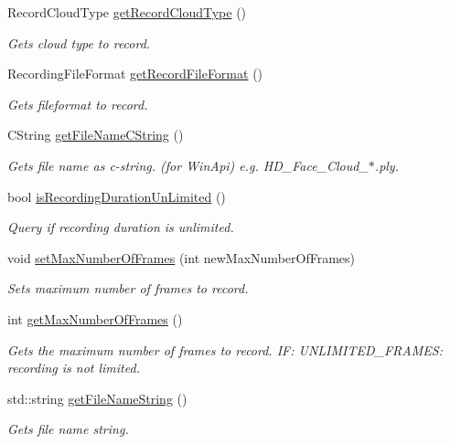 \begin{DoxyCompactItemize}
Record\+Cloud\+Type \hyperlink{class_recording_configuration_af1632f5480869116ff282d5c34bd8319}{get\+Record\+Cloud\+Type} ()
\begin{DoxyCompactList}\small\item\em Gets cloud type to record. \end{DoxyCompactList}\item 
Recording\+File\+Format \hyperlink{class_recording_configuration_a9e319b60a4bddc838b56186b8f07bab5}{get\+Record\+File\+Format} ()
\begin{DoxyCompactList}\small\item\em Gets fileformat to record. \end{DoxyCompactList}\item 
C\+String \hyperlink{class_recording_configuration_adfdbe3e11f2445b8ba723ccadc0159bf}{get\+File\+Name\+C\+String} ()
\begin{DoxyCompactList}\small\item\em Gets file name as c-\/string. (for Win\+Api) e.\+g. H\+D\+\_\+\+Face\+\_\+\+Cloud\+\_\+$\ast$.ply. \end{DoxyCompactList}\item 
bool \hyperlink{class_recording_configuration_a4f68458e01f778ea850e47aa658b6212}{is\+Recording\+Duration\+Un\+Limited} ()
\begin{DoxyCompactList}\small\item\em Query if recording duration is unlimited. \end{DoxyCompactList}\item 
void \hyperlink{class_recording_configuration_aa26251ebb771b20f5042adead21f14ab}{set\+Max\+Number\+Of\+Frames} (int new\+Max\+Number\+Of\+Frames)
\begin{DoxyCompactList}\small\item\em Sets maximum number of frames to record. \end{DoxyCompactList}\item 
int \hyperlink{class_recording_configuration_a933bc95cc26966c34984c9de7c5681f3}{get\+Max\+Number\+Of\+Frames} ()
\begin{DoxyCompactList}\small\item\em Gets the maximum number of frames to record. I\+F\+: U\+N\+L\+I\+M\+I\+T\+E\+D\+\_\+\+F\+R\+A\+M\+E\+S\+: recording is not limited. \end{DoxyCompactList}\item 
std\+::string \hyperlink{class_recording_configuration_a47942807d4279966c8f61ecacdfeed27}{get\+File\+Name\+String} ()
\begin{DoxyCompactList}\small\item\em Gets file name string. \end{DoxyCompactList}\item 

\end{DoxyCompactItemize}
